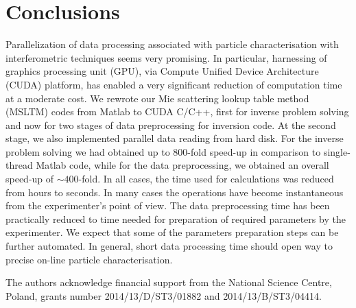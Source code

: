 \documentclass[12pt,dvips]{elsarticle}
\begin{document}
\section{Conclusions}
Parallelization of data processing associated with particle characterisation with interferometric techniques seems very
promising. In particular, harnessing of graphics processing unit (GPU), via Compute Unified Device Architecture (CUDA)
platform, has enabled a very significant reduction of computation time at a moderate cost. We rewrote our Mie scattering
lookup table method (MSLTM) codes from Matlab to CUDA C/C++, first for inverse problem solving \cite{Smigacz} and now for
two stages of data preprocessing for inversion code. At the second stage, we also implemented parallel data reading from
hard disk. For the inverse problem solving we had obtained up to 800-fold speed-up in comparison to single-thread Matlab
code, while for the data preprocessing, we obtained an overall speed-up of $\sim 400$-fold. In all cases, the time used
for calculations was reduced from hours to seconds. In many cases the operations have become instantaneous from the
experimenter's point of view. The data preprocessing time has been practically reduced to time needed for preparation of
required parameters by the experimenter. We expect that some of the parameters preparation steps can be further automated.
In general, short data processing time should open way to precise on-line particle characterisation.

 The authors acknowledge financial support from the National Science Centre, Poland, grants
number 2014/13/D/ST3/01882 and 2014/13/B/ST3/04414.

%


\end{document}

